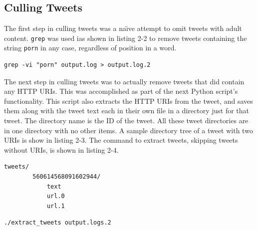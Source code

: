 \documentclass[a4paper,12pt]{article}
\begin{document}
\subsection{Culling Tweets}
The first step in culling tweets was a na\"{\i}ve attempt to omit tweets with adult content. \texttt{grep}
was used ias shown in listing 2-2 to remove tweets containing the string \texttt{porn} in any case,
regardless of position in a word.
\begin{lstlisting}[basicstyle=\ttfamily,caption={Removing Naughty Tweets}]
    grep -vi "porn" output.log > output.log.2
\end{lstlisting}
The next step in culling tweets was to actually remove tweets that did contain any HTTP URIs. This was
accomplished as part of the next Python script's functionality. This script also extracts the HTTP URIs from
 the tweet, and saves them along with the tweet text each in their own file in a directory just for that
tweet. The directory name is the ID of the tweet. All these tweet directories are in one directory with
no other items. A sample directory tree of a tweet with two URIs is show in
listing 2-3. The command to extract tweets, skipping tweets without URIs, is shown in listing 2-4.
\begin{lstlisting}[basicstyle=\ttfamily,caption={Tweet Directory Structure}]
    tweets/
        560614568091602944/
            text
            url.0
            url.1
\end{lstlisting}
\begin{lstlisting}[basicstyle=\ttfamily,caption={Extracting Tweets}]
    ./extract_tweets output.logs.2
\end{lstlisting}
\end{document}

